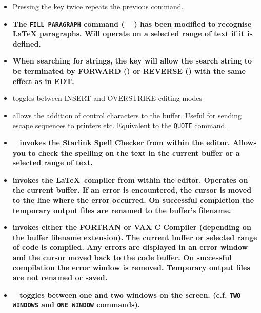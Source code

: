 \begin{itemize}
\item Pressing the  key twice repeats the previous command.

\item {\bf The {\tt FILL PARAGRAPH} command ( \gold\  ) has been
      modified to recognise {\LaTeX} paragraphs. Will operate on a selected
      range of text if it is defined.}

\item {\bf When searching for strings, the  key will allow the
      search string to be terminated by FORWARD () or REVERSE
      () with the same effect as in EDT.}

\item {} toggles between INSERT and OVERSTRIKE editing modes

\item {}  allows the addition of control characters to
      the buffer.
      Useful for sending escape sequences to printers etc. Equivalent to
      the {\tt QUOTE} command.

\item {\bf \gold\  invokes the Starlink Spell Checker from within
      the editor.
      Allows you to check the spelling on the text in the current buffer or a
      selected range of text.}

\item {\bf {}  invokes the \LaTeX\ compiler from within
      the editor.
      Operates on the current buffer. If an error is encountered, the cursor is
      moved to the line where the error occurred. On successful completion the
      temporary output files are renamed to the buffer's filename.}

\item {\bf {}  invokes either the FORTRAN or VAX C
       Compiler (depending on the buffer filename extension). The current
       buffer or selected range of code is compiled. Any errors are displayed
       in an error window and the cursor moved back to the code buffer. On
       successful compilation the error window is removed. Temporary output
      files are not renamed or saved.}

\item {\bf \gold\ \keyname{=} toggles between one and two windows on the screen.
      (c.f. {\tt TWO WINDOWS} and {\tt ONE WINDOW} commands). }


\end{itemize}
